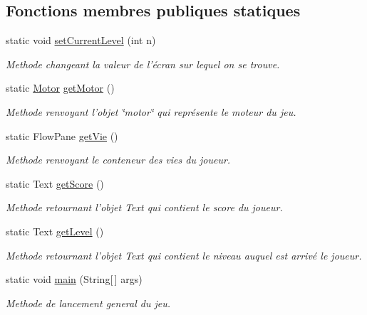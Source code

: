 \subsection*{Fonctions membres publiques statiques}
\begin{DoxyCompactItemize}
\item 
static void \hyperlink{class_game_a6820c58e98b057326b794a928352ff8a}{set\-Current\-Level} (int n)
\begin{DoxyCompactList}\small\item\em Methode changeant la valeur de l'écran sur lequel on se trouve. \end{DoxyCompactList}\item 
static \hyperlink{class_motor}{Motor} \hyperlink{class_game_ad2ca85b9da3d4f432e80c4c30d27a04a}{get\-Motor} ()
\begin{DoxyCompactList}\small\item\em Methode renvoyant l'objet \char`\"{}motor\char`\"{} qui représente le moteur du jeu. \end{DoxyCompactList}\item 
static Flow\-Pane \hyperlink{class_game_aa1efcee841a5a0f096b824b1aca2bfb5}{get\-Vie} ()
\begin{DoxyCompactList}\small\item\em Methode renvoyant le conteneur des vies du joueur. \end{DoxyCompactList}\item 
static Text \hyperlink{class_game_a88c9ee21de18322252a578965d6d95d5}{get\-Score} ()
\begin{DoxyCompactList}\small\item\em Methode retournant l'objet Text qui contient le score du joueur. \end{DoxyCompactList}\item 
static Text \hyperlink{class_game_a45ca829175e700eee22814f7692e9224}{get\-Level} ()
\begin{DoxyCompactList}\small\item\em Methode retournant l'objet Text qui contient le niveau auquel est arrivé le joueur. \end{DoxyCompactList}\item 
static void \hyperlink{class_game_ae52595a27ac1b327b05db2129ad81fca}{main} (String\mbox{[}$\,$\mbox{]} args)
\begin{DoxyCompactList}\small\item\em Methode de lancement general du jeu. \end{DoxyCompactList}\end{DoxyCompactItemize}
